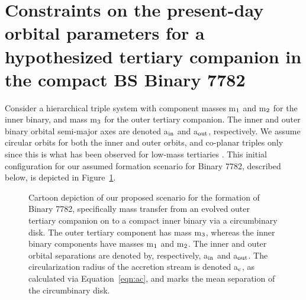\documentclass{aastex62}
\begin{document}
\section{Constraints on the present-day orbital parameters for a hypothesized tertiary companion in the compact BS Binary 7782} \label{dyn}

Consider a hierarchical triple system with component masses m$_{\rm 1}$ and m$_{\rm 2}$ for the inner binary, and mass m$_{\rm 3}$ for the outer tertiary companion.  The inner and outer binary orbital semi-major axes are denoted a$_{\rm in}$ and a$_{\rm out}$, respectively.  We assume circular orbits for both the inner and outer orbits, and co-planar triples only since this is what has been observed for low-mass tertiaries \citep[e.g.][]{moe18,tobin18}.  This initial configuration for our assumed formation scenario for Binary 7782, described below, is depicted in Figure~\ref{fig:fig1}.

\begin{figure}[ht!]
\caption{Cartoon depiction of our proposed scenario for the formation of Binary 7782, specifically mass transfer from an evolved outer tertiary companion on to a compact inner binary via a circumbinary disk.  The outer tertiary component has mass m$_{\rm 3}$, whereas the inner binary components have masses m$_{\rm 1}$ and m$_{\rm 2}$.  The inner and outer orbital separations are denoted by, respectively, a$_{\rm in}$ and a$_{\rm out}$.  The circularization radius of the accretion stream is denoted a$_{\rm c}$, as calculated via Equation~\ref{eqn:ac}, and marks the mean separation of the circumbinary disk.
\label{fig:fig1}}
\end{figure}
\end{document}
